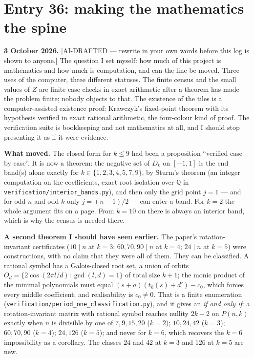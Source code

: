 \documentclass[12pt]{article}
\begin{document}
\section*{Entry 36: making the mathematics the spine}

\textbf{3 October 2026.} [AI-DRAFTED --- rewrite in your own words before this
log is shown to anyone.] The question I set myself: how much of this project
is mathematics and how much is computation, and can the line be moved. Three
uses of the computer, three different statuses. The finite census and the
small values of $Z$ are finite case checks in exact arithmetic after a theorem
has made the problem finite; nobody objects to that. The existence of the tiles
is a computer-assisted existence proof: Krawczyk's fixed-point theorem with its
hypothesis verified in exact rational arithmetic, the four-colour kind of
proof. The verification suite is bookkeeping and not mathematics at all, and I
should stop presenting it as if it were evidence.

\textbf{What moved.} The closed form for $k\le9$ had been a proposition
``verified case by case''. It is now a theorem: the negative set of $D_k$ on
$[-1,1]$ is the end band(s) alone exactly for $k\in\{1,2,3,4,5,7,9\}$, by Sturm's
theorem (an integer computation on the coefficients, exact root isolation over
$\mathbb Q$ in \texttt{verification/interior\_bands.py}), and then only the
grid point $j=1$ --- and for odd $n$ and odd $k$ only $j=(n-1)/2$ --- can enter
a band. For $k=2$ the whole argument fits on a page. From $k=10$ on there is
always an interior band, which is why the census is needed there.

\textbf{A second theorem I should have seen earlier.} The paper's
rotation-invariant certificates ($10\mid n$ at $k=3$; $60,70,90\mid n$ at
$k=4$; $24\mid n$ at $k=5$) were constructions, with no claim that they were
all of them. They can be classified. A rational symbol has a Galois-closed root
set, a union of orbits $O_d=\{2\cos(2\pi l/d):\gcd(l,d)=1\}$ of total size
$k+1$; the monic product of the minimal polynomials must equal
$(s+a)(t_k(s)+d')-c_0$, which forces every middle coefficient; and
realisability is $c_0\ne0$. That is a finite enumeration
(\texttt{verification/period\_one\_classification.py}), and it gives an
\emph{if and only if}: a rotation-invariant matrix with rational symbol reaches
nullity $2k+2$ on $P(n,k)$ exactly when $n$ is divisible by one of $7,9,15,20$
($k=2$); $10,24,42$ ($k=3$); $60,70,90$ ($k=4$); $24,126$ ($k=5$); and never
for $k=6$, which recovers the $k=6$ impossibility as a corollary. The classes
$24$ and $42$ at $k=3$ and $126$ at $k=5$ are new.
\end{document}
